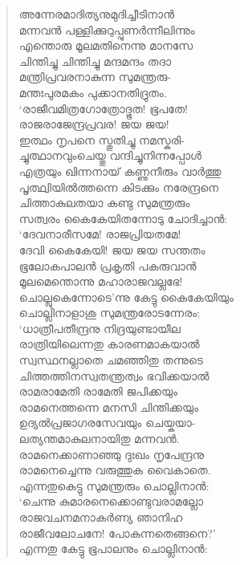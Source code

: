\begin{verse}
അന്നേരമാദിത്യനുമുദിച്ചീടിനാന്‍\\
മന്നവന്‍ പള്ളിക്കുറുപ്പുണര്‍ന്നീലിന്നും\\
എന്തൊരു മൂലമതിനെന്നു മാനസേ\\
ചിന്തിച്ചു ചിന്തിച്ചു മന്ദമന്ദം തദാ\\
മന്ത്രിപ്രവരനാകുന്ന സുമന്ത്രരു-\\
മന്തഃപുരമകം പുക്കാനതിദ്രുതം.\\
‘രാജീവമിത്രഗോത്രോദ്ഭൂത! ഭൂപതേ!\\
രാജരാജേന്ദ്രപ്രവര! ജയ ജയ!\\
ഇത്ഥം നൃപനെ സ്തുതിച്ചു നമസ്കരി-\\
ച്ചുത്ഥാനവുംചെയ്തു വന്ദിച്ചുനിന്നപ്പോള്‍\\
എത്രയും ഖിന്നനായ് കണ്ണുനീരും വാര്‍ത്തു\\
പൃത്ഥ്വിയില്‍ത്തന്നെ കിടക്കും നരേന്ദ്രനെ\\
ചിത്താകുലതയാ കണ്ടു സുമന്ത്രരും\\
സത്വരം കൈകേയിതന്നോടു ചോദിച്ചാന്‍:\\
‘ദേവനാരീസമേ! രാജപ്രിയതമേ!\\
ദേവി കൈകേയി! ജയ ജയ സന്തതം\\
ഭൂലോകപാലന്‍ പ്രകൃതി പകരുവാന്‍\\
മൂലമെന്തൊന്നു മഹാരാജവല്ലഭേ!\\
ചൊല്ലുകെന്നോടെ’ന്നു കേട്ടു കൈകേയിയും\\
ചൊല്ലിനാളാശു സുമന്ത്രരോടന്നേരം:\\
‘ധാത്രീപതീന്ദ്രനു നിദ്രയുണ്ടായീല\\
രാത്രിയിലെന്നതു കാരണമാകയാല്‍\\
സ്വസ്ഥനല്ലാതെ ചമഞ്ഞിതു തന്നുടെ\\
ചിത്തത്തിനസ്വതന്ത്രത്വം ഭവിക്കയാല്‍\\
രാമരാമേതി രാമേതി ജപിക്കയും\\
രാമനെത്തന്നെ മനസി ചിന്തിക്കയും\\
ഉദ്യല്‍പ്രജാഗരസേവയും ചെയ്കയാ-\\
ലത്യന്തമാകുലനായിതു മന്നവന്‍.\\
രാമനെക്കാണാഞ്ഞു ദുഃഖം നൃപേന്ദ്രനു\\
രാമനെച്ചെന്നു വരുത്തുക വൈകാതെ.\\
എന്നതുകെട്ടു സുമന്ത്രരും ചൊല്ലിനാന്‍:\\
‘ചെന്നു കുമാരനെക്കൊണ്ടുവരാമല്ലോ\\
രാജവചനമനാകര്‍ണ്യ ഞാനിഹ\\
രാജീവലോചനേ! പോകുന്നതെങ്ങനെ?’\\
എന്നതു കേട്ടു ഭൂപാലനും ചൊല്ലിനാന്‍:\\

\end{verse}
